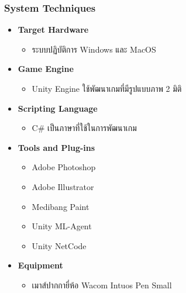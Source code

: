 \documentclass[12pt,oneside,openright,a4paper]{cpe-thai-project}
\begin{document}
\pagebreak
\subsubsection{System Techniques}
\begin{itemize}
  \item \textbf{Target Hardware}
  \begin{itemize}
    \item ระบบปฏิบัติการ Windows และ MacOS
  \end{itemize} 
  \item \textbf{Game Engine}
  \begin{itemize}
    \item Unity Engine ใช้พัฒนาเกมที่มีรูปแบบภาพ 2 มิติ
  \end{itemize} 
  \item \textbf{Scripting Language}
  \begin{itemize}
    \item C\# เป็นภาษาที่ใช้ในการพัฒนาเกม
  \end{itemize} 
  \item \textbf{Tools and Plug-ins}
  \begin{itemize}
    \item Adobe Photoshop
    \item Adobe Illustrator
    \item Medibang Paint
    \item Unity ML-Agent
    \item Unity NetCode
  \end{itemize} 
  \item \textbf{Equipment}
  \begin{itemize}
    \item เมาส์ปากกายี่ห้อ Wacom Intuos Pen Small
  \end{itemize} 
\end{itemize}
\end{document}
